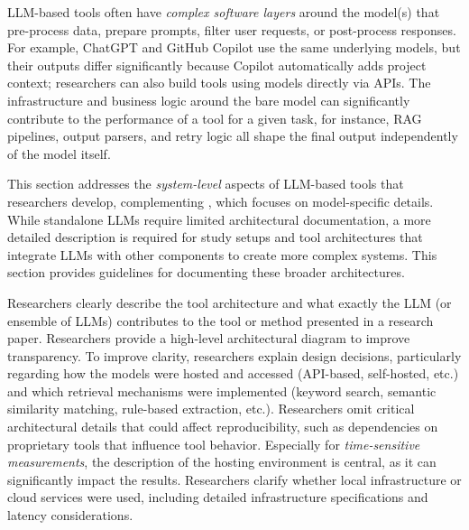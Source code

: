 
LLM-based tools often have \emph{complex software layers} around the model(s) that pre-process data, prepare prompts, filter user requests, or post-process responses.
For example, ChatGPT and GitHub Copilot use the same underlying models, but their outputs differ significantly because Copilot automatically adds project context; researchers can also build tools using models directly via APIs.
The infrastructure and business logic around the bare model can significantly contribute to the performance of a tool for a given task, for instance, RAG pipelines, output parsers, and retry logic all shape the final output independently of the model itself.

This section addresses the \emph{system-level} aspects of LLM-based tools that researchers develop, complementing \modelversion, which focuses on model-specific details.
While standalone LLMs require limited architectural documentation, a more detailed description is required for study setups and tool architectures that integrate LLMs with other components to create more complex systems.
This section provides guidelines for documenting these broader architectures.



Researchers \must clearly describe the tool architecture and what exactly the LLM (or ensemble of LLMs) contributes to the tool or method presented in a research paper.
Researchers \should provide a high-level architectural diagram to improve transparency.
To improve clarity, researchers \should explain design decisions, particularly regarding how the models were hosted and accessed (API-based, self-hosted, etc.) and which retrieval mechanisms were implemented (keyword search, semantic similarity matching, rule-based extraction, etc.).
Researchers \mustnot omit critical architectural details that could affect reproducibility, such as dependencies on proprietary tools that influence tool behavior.
Especially for \emph{time-sensitive measurements}, the description of the hosting environment is central, as it can significantly impact the results.
Researchers \must clarify whether local infrastructure or cloud services were used, including detailed infrastructure specifications and latency considerations.

